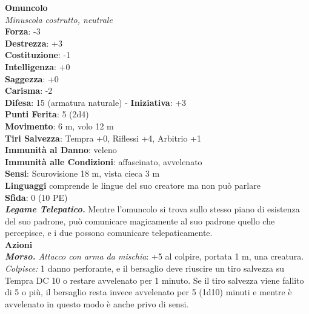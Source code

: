 \begin{multicols}{2}
\medskip\textbf{Omuncolo}\\
\emph{Minuscola costrutto, neutrale}\\
\textbf{Forza}: -3\\
\textbf{Destrezza}: +3\\
\textbf{Costituzione}: -1\\
\textbf{Intelligenza}: +0\\
\textbf{Saggezza}: +0\\
\textbf{Carisma}: -2\\
\textbf{Difesa}: 15 (armatura naturale) - \textbf{Iniziativa}: +3\\
\textbf{Punti Ferita}: 5 (2d4)\\
\textbf{Movimento}: 6 m, volo 12 m\\
\textbf{Tiri Salvezza}:  Tempra +0, Riflessi +4, Arbitrio +1\\
\textbf{Immunità al Danno}: veleno\\
\textbf{Immunità alle Condizioni}: affascinato, avvelenato\\
\textbf{Sensi}: Scurovisione 18 m, vista cieca 3 m\\
\textbf{Linguaggi} comprende le lingue del suo creatore ma non può parlare\\
\textbf{Sfida}: 0 (10 PE)\smallskip\\
\emph{\textbf{Legame Telepatico.}} Mentre l'omuncolo si trova sullo stesso piano di esistenza del suo padrone, può comunicare magicamente al suo padrone quello che percepisce, e i due possono comunicare telepaticamente.\\
\smallskip\textbf{Azioni}\\
\emph{\textbf{Morso.} Attacco con arma da mischia}: +5 al colpire, portata 1 m, una creatura.\\
\emph{Colpisce:} 1 danno perforante, e il bersaglio deve riuscire un tiro salvezza su Tempra DC 10 o restare avvelenato per 1 minuto. Se il tiro salvezza viene fallito di 5 o più, il bersaglio resta invece avvelenato per 5 (1d10) minuti e mentre è avvelenato in questo modo è anche privo di sensi.\\


\end{multicols}
